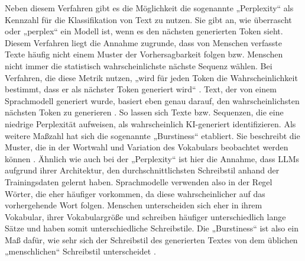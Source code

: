 Neben diesem Verfahren gibt es die Möglichkeit die sogenannte „Perplexity“ als Kennzahl für die Klassifikation von Text zu nutzen. Sie gibt an, wie überrascht oder „perplex“ ein Modell ist, wenn es den nächsten generierten Token sieht. Diesem Verfahren liegt die Annahme zugrunde, dass von Menschen verfasste Texte häufig nicht einem Muster der Vorhersagbarkeit folgen bzw. Menschen nicht immer die statistisch wahrscheinlichste nächste Sequenz wählen. Bei Verfahren, die diese Metrik nutzen, „wird für jeden Token die Wahrscheinlichkeit bestimmt, dass er als nächster Token generiert wird“ \autocite{Proehl_Mohrhardt_Foerster_Putzier_Zarnekow_2024}. Text, der von einem Sprachmodell generiert wurde, basiert eben genau darauf, den wahrscheinlichsten nächsten Token zu generieren \autocite{Proehl_Mohrhardt_Foerster_Putzier_Zarnekow_2024}. So lassen sich Texte bzw. Sequenzen, die eine niedrige Perplexität aufweisen, als wahrscheinlich KI-generiert identifizieren. Als weitere Maßzahl hat sich die sogenannte „Burstiness“ etabliert. Sie beschreibt die Muster, die in der Wortwahl und Variation des Vokabulars beobachtet werden können \autocite{chakraborty2023counterturingtestct2}. Ähnlich wie auch bei der „Perplexity“ ist hier die Annahme, dass LLMs aufgrund ihrer Architektur, den durchschnittlichsten Schreibstil anhand der Trainingsdaten gelernt haben. Sprachmodelle verwenden also in der Regel Wörter, die eher häufiger vorkommen, da diese wahrscheinlicher auf das vorhergehende Wort folgen. Menschen unterscheiden sich eher in ihrem Vokabular, ihrer Vokabulargröße und schreiben häufiger unterschiedlich lange Sätze und haben somit unterschiedliche Schreibstile. Die „Burstiness“ ist also ein Maß dafür, wie sehr sich der Schreibstil des generierten Textes von dem üblichen „menschlichen“ Schreibstil unterscheidet \autocite{Proehl_Mohrhardt_Foerster_Putzier_Zarnekow_2024}.

